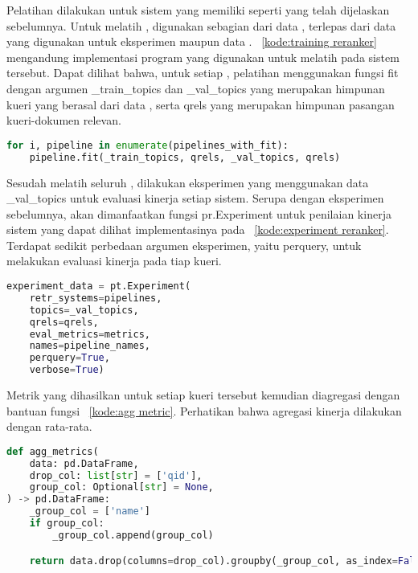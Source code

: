 Pelatihan dilakukan untuk sistem yang memiliki \pipeline{} \reranker{} seperti yang telah dijelaskan sebelumnya. Untuk melatih \lambdamart{}, digunakan sebagian dari data \training{}, terlepas dari data yang digunakan untuk eksperimen maupun data \testing{}. \kode{}~\ref{kode:training reranker} mengandung implementasi program yang digunakan untuk melatih \reranker{} pada sistem \ir{} tersebut. Dapat dilihat bahwa, untuk setiap \pipeline{}, pelatihan menggunakan fungsi fit dengan argumen \_train\_topics dan \_val\_topics yang merupakan himpunan kueri yang berasal dari data \training{}, serta qrels yang merupakan himpunan pasangan kueri-dokumen relevan.
\begin{lstlisting}[language=Python, caption={Pelatihan model \reranker{}}, label={kode:training reranker}]
for i, pipeline in enumerate(pipelines_with_fit):
    pipeline.fit(_train_topics, qrels, _val_topics, qrels)
\end{lstlisting}

Sesudah melatih seluruh \reranker{}, dilakukan eksperimen yang menggunakan data \_val\_topics untuk evaluasi kinerja setiap sistem. Serupa dengan eksperimen sebelumnya, akan dimanfaatkan fungsi pr.Experiment untuk penilaian kinerja sistem yang dapat dilihat implementasinya pada \kode{}~\ref{kode:experiment reranker}. Terdapat sedikit perbedaan argumen eksperimen, yaitu perquery, untuk melakukan evaluasi kinerja pada tiap kueri.
\begin{lstlisting}[language=Python, caption={Eksperimen \retrieval{}}, label={kode:experiment reranker}]
experiment_data = pt.Experiment(
    retr_systems=pipelines,
    topics=_val_topics,
    qrels=qrels,
    eval_metrics=metrics,
    names=pipeline_names,
    perquery=True,
    verbose=True)
\end{lstlisting}

Metrik yang dihasilkan untuk setiap kueri tersebut kemudian diagregasi dengan bantuan fungsi \kode{}~\ref{kode:agg metric}. Perhatikan bahwa agregasi kinerja dilakukan dengan rata-rata.
\begin{lstlisting}[language=Python, caption={Agregasi metrik hasil eksperimen}, label={kode:agg metric}]
def agg_metrics(
    data: pd.DataFrame,
    drop_col: list[str] = ['qid'],
    group_col: Optional[str] = None,
) -> pd.DataFrame:
    _group_col = ['name']
    if group_col:
        _group_col.append(group_col)

    return data.drop(columns=drop_col).groupby(_group_col, as_index=False).mean()
\end{lstlisting}
